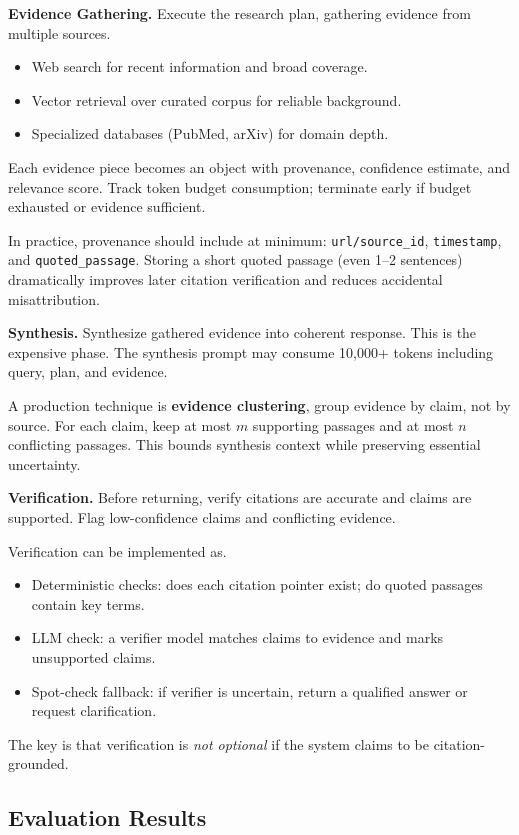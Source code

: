 \textbf{Evidence Gathering.} Execute the research plan, gathering evidence from multiple sources.
\begin{itemize}
\item Web search for recent information and broad coverage.
\item Vector retrieval over curated corpus for reliable background.
\item Specialized databases (PubMed, arXiv) for domain depth.
\end{itemize}

Each evidence piece becomes an object with provenance, confidence estimate, and relevance score. Track token budget consumption; terminate early if budget exhausted or evidence sufficient.

In practice, provenance should include at minimum: \texttt{url/source\_id}, \texttt{timestamp}, and \texttt{quoted\_passage}. Storing a short quoted passage (even 1--2 sentences) dramatically improves later citation verification and reduces accidental misattribution.

\textbf{Synthesis.} Synthesize gathered evidence into coherent response. This is the expensive phase. The synthesis prompt may consume 10,000+ tokens including query, plan, and evidence.

A production technique is \textbf{evidence clustering}, group evidence by claim, not by source. For each claim, keep at most $m$ supporting passages and at most $n$ conflicting passages. This bounds synthesis context while preserving essential uncertainty.

\textbf{Verification.} Before returning, verify citations are accurate and claims are supported. Flag low-confidence claims and conflicting evidence.

Verification can be implemented as.
\begin{itemize}
\item Deterministic checks: does each citation pointer exist; do quoted passages contain key terms.
\item LLM check: a verifier model matches claims to evidence and marks unsupported claims.
\item Spot-check fallback: if verifier is uncertain, return a qualified answer or request clarification.
\end{itemize}
The key is that verification is \textit{not optional} if the system claims to be citation-grounded.

\subsection{Evaluation Results}

